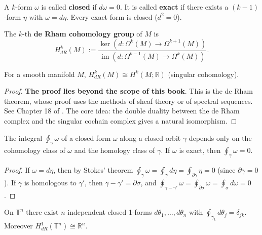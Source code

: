 \begin{definition}\label{def:closed_exact_forms}
A $k$-form $\omega$ is called \textbf{closed} if $d\omega=0$. It is called \textbf{exact} if there exists a $(k-1)$-form $\eta$ with $\omega=d\eta$. Every exact form is closed ($d^2=0$).
\end{definition}

\begin{definition}\label{def:de_rham}
The $k$-th \textbf{de Rham cohomology group} of $M$ is
\[
H^k_{dR}(M):=\frac{\ker(d:\Omega^k(M)\to\Omega^{k+1}(M))}{\operatorname{im}(d:\Omega^{k-1}(M)\to\Omega^k(M))}.
\]
\end{definition}

\begin{theorem}\label{thm:de_rham}
For a smooth manifold $M$, $H^k_{dR}(M)\cong H^k(M;\mathbb{R})$ (singular cohomology).
\end{theorem}

\begin{proof}
\textbf{The proof lies beyond the scope of this book}. This is the de Rham theorem, whose proof uses the methods of sheaf theory or of spectral sequences. See Chapter 18 of \cite{lee2012smooth}. The core idea: the double duality between the de Rham complex and the singular cochain complex gives a natural isomorphism.
\end{proof}

\begin{proposition}\label{prop:period_integral}
The integral $\oint_\gamma\omega$ of a closed form $\omega$ along a closed orbit $\gamma$ depends only on the cohomology class of $\omega$ and the homology class of $\gamma$. If $\omega$ is exact, then $\oint_\gamma\omega=0$.
\end{proposition}

\begin{proof}
If $\omega=d\eta$, then by Stokes' theorem $\oint_\gamma\omega=\oint_\gamma d\eta=\oint_{\partial\gamma}\eta=0$ (since $\partial\gamma=0$). If $\gamma$ is homologous to $\gamma'$, then $\gamma-\gamma'=\partial\sigma$, and $\oint_{\gamma-\gamma'}\omega=\oint_{\partial\sigma}\omega=\oint_\sigma d\omega=0$.
\end{proof}

\begin{example}\label{ex:torus_harmonic_forms}
On $\mathbb{T}^n$ there exist $n$ independent closed 1-forms $d\theta_1,\dots,d\theta_n$ with $\oint_{\gamma_k}d\theta_j=\delta_{jk}$. Moreover $H^1_{dR}(\mathbb{T}^n)\cong\mathbb{R}^n$.
\end{example}

